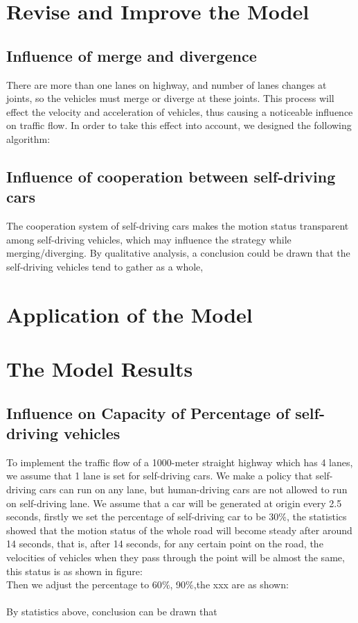 \documentclass{icmmcm}
\begin{document}
\section{Revise and Improve the Model}
\subsection{Influence of merge and divergence}
There are more than one lanes on highway, and number of lanes changes at joints, so the vehicles must merge or diverge at these joints. This process will effect the velocity and acceleration of vehicles, thus causing a noticeable influence on traffic flow. In order to take this effect into account, we designed the following algorithm:\\
\subsection{Influence of cooperation between self-driving cars}
The cooperation system of self-driving cars makes the motion status transparent among self-driving vehicles, which may influence the strategy while merging/diverging. By qualitative analysis, a conclusion could be drawn that the self-driving vehicles tend to gather as a whole,
\section{Application of the Model}%
\section{The Model Results}
\subsection{Influence on Capacity of Percentage of self-driving vehicles}
To implement the traffic flow of a 1000-meter straight highway which has 4 lanes, we assume that 1 lane is set for self-driving cars. We make a policy that self-driving cars can run on any lane, but human-driving cars are not allowed to run on self-driving lane. We assume that a car will be generated at origin every 2.5 seconds, firstly we set the percentage of self-driving car to be 30$\%$, the statistics showed that the motion status of the whole  road will become steady after around 14 seconds, that is, after 14 seconds, for any certain point on the road, the velocities of vehicles when they pass through the point will be almost the same, this status is as shown in figure:\\
Then we adjust the percentage to 60$\%$, 90$\%$,the xxx are as shown:\\
\\
By statistics above, conclusion can be drawn that 
\end{document}
